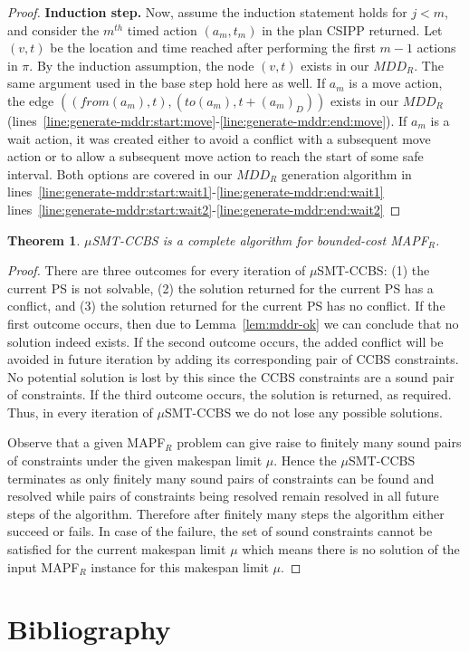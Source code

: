 \documentclass[review]{elsarticle}
\newtheorem{theorem}{Theorem}
\newcommand{\mddr}{\ensuremath{MDD_R}\xspace}
\newcommand{\fromv}{\ensuremath{\mathit{from}}\xspace}
\newcommand{\tov}{\ensuremath{\mathit{to}}\xspace}
\newcommand{\ccbs}{\ac{CCBS}\xspace}
\newcommand{\csipp}{\ac{CSIPP}\xspace}
\newcommand{\ps}{\ac{PS}\xspace}
\newcommand{\mapfr}{\ac{MAPF}$_R$\xspace}
\newcommand{\musmtccbs}{\ensuremath{\mu}SMT-CCBS\xspace}
\newcommand{\mapf}{\ac{MAPF}\xspace}
\begin{document}
\begin{proof}
\textbf{Induction step.}
Now, assume the induction statement holds for $j<m$, and consider the $m^{th}$ timed action $(a_m, t_m)$ in the plan \csipp returned. 
Let $(v,t)$ be the location and time reached after performing the first $m-1$ actions in $\pi$. 
By the induction assumption, the node $(v,t)$ exists in our \mddr. 
The same argument used in the base step hold here as well. 
If $a_m$ is a move action, the edge $((\fromv(a_m), t),(\tov(a_m),t+(a_m)_D))$ exists in our \mddr (lines~\ref{line:generate-mddr:start:move}-\ref{line:generate-mddr:end:move}). 
If $a_m$ is a wait action, it was created either to avoid a conflict with a subsequent move action or to allow a subsequent move action to reach the start of some safe interval.  
Both options are covered in our \mddr generation algorithm in 
lines~\ref{line:generate-mddr:start:wait1}-\ref{line:generate-mddr:end:wait1}
lines~\ref{line:generate-mddr:start:wait2}-\ref{line:generate-mddr:end:wait2}
\end{proof}


\begin{theorem}
	\musmtccbs is a complete algorithm for bounded-cost \mapfr. 
	\label{the:bounded-cost-makespan-apppendix}
\end{theorem}
\begin{proof}
	There are three outcomes for every iteration of \musmtccbs: (1) the current \ps is not solvable, (2) the solution returned for the current \ps has a conflict, 
	and (3) the solution returned for the current \ps has no conflict. 
	If the first outcome occurs, then due to Lemma~\ref{lem:mddr-ok} we can conclude that no solution indeed exists. 
	If the second outcome occurs, the added conflict 
	will be avoided in future iteration by adding its corresponding pair of \ccbs constraints. 
	No potential solution is lost by this since the \ccbs constraints are a sound pair of constraints. 
	If the third outcome occurs, the solution is returned, as required. 
	Thus, in every iteration of \musmtccbs we do not lose any possible solutions. 
	
	
	Observe that a given \mapfr problem  can give raise to finitely many sound pairs of constraints under the given makespan limit $\mu$. Hence the \musmtccbs terminates as only finitely many sound pairs of constraints can be found and resolved while pairs of constraints being resolved remain resolved in all future steps of the algorithm. Therefore after finitely many steps the algorithm either succeed or fails. In case of the failure, the set of sound constraints cannot be satisfied for the current makespan limit $\mu$ which means there is no solution of the input \mapfr instance for this makespan limit $\mu$.
\end{proof}


%
\section*{Bibliography}




\end{document}
